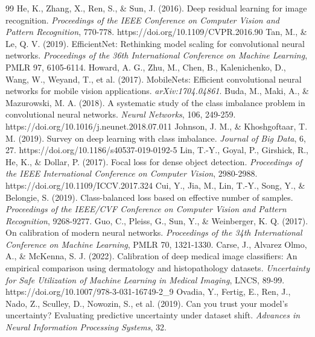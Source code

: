 \documentclass[11pt,a4paper]{article}
\begin{document}
\begin{thebibliography}{99}
 He, K., Zhang, X., Ren, S., \& Sun, J. (2016). Deep residual learning for image recognition. \textit{Proceedings of the IEEE Conference on Computer Vision and Pattern Recognition}, 770-778. https://doi.org/10.1109/CVPR.2016.90
 Tan, M., \& Le, Q. V. (2019). EfficientNet: Rethinking model scaling for convolutional neural networks. \textit{Proceedings of the 36th International Conference on Machine Learning}, PMLR 97, 6105-6114.
 Howard, A. G., Zhu, M., Chen, B., Kalenichenko, D., Wang, W., Weyand, T., et al. (2017). MobileNets: Efficient convolutional neural networks for mobile vision applications. \textit{arXiv:1704.04861}.
 Buda, M., Maki, A., \& Mazurowski, M. A. (2018). A systematic study of the class imbalance problem in convolutional neural networks. \textit{Neural Networks}, 106, 249-259. https://doi.org/10.1016/j.neunet.2018.07.011
 Johnson, J. M., \& Khoshgoftaar, T. M. (2019). Survey on deep learning with class imbalance. \textit{Journal of Big Data}, 6, 27. https://doi.org/10.1186/s40537-019-0192-5
 Lin, T.-Y., Goyal, P., Girshick, R., He, K., \& Dollar, P. (2017). Focal loss for dense object detection. \textit{Proceedings of the IEEE International Conference on Computer Vision}, 2980-2988. https://doi.org/10.1109/ICCV.2017.324
 Cui, Y., Jia, M., Lin, T.-Y., Song, Y., \& Belongie, S. (2019). Class-balanced loss based on effective number of samples. \textit{Proceedings of the IEEE/CVF Conference on Computer Vision and Pattern Recognition}, 9268-9277.
 Guo, C., Pleiss, G., Sun, Y., \& Weinberger, K. Q. (2017). On calibration of modern neural networks. \textit{Proceedings of the 34th International Conference on Machine Learning}, PMLR 70, 1321-1330.
 Carse, J., Alvarez Olmo, A., \& McKenna, S. J. (2022). Calibration of deep medical image classifiers: An empirical comparison using dermatology and histopathology datasets. \textit{Uncertainty for Safe Utilization of Machine Learning in Medical Imaging}, LNCS, 89-99. https://doi.org/10.1007/978-3-031-16749-2\_9
 Ovadia, Y., Fertig, E., Ren, J., Nado, Z., Sculley, D., Nowozin, S., et al. (2019). Can you trust your model's uncertainty? Evaluating predictive uncertainty under dataset shift. \textit{Advances in Neural Information Processing Systems}, 32.

\end{thebibliography}
\end{document}
